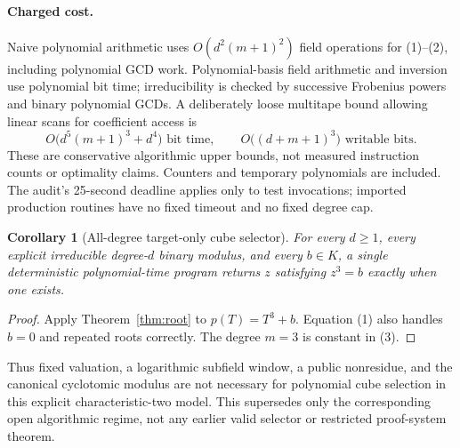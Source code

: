 \documentclass[11pt]{article}
\newtheorem{corollary}[theorem]{Corollary}
\begin{document}
\paragraph{Charged cost.}
Naive polynomial arithmetic uses $O(d^2(m+1)^2)$ field operations for
(1)--(2), including polynomial GCD work. Polynomial-basis field arithmetic
and inversion use polynomial bit time; irreducibility is checked by
successive Frobenius powers and binary polynomial GCDs. A deliberately loose
multitape bound allowing linear scans for coefficient access is
\[
 O\bigl(d^5(m+1)^3+d^4\bigr)\text{ bit time},
 \qquad O\bigl((d+m+1)^3\bigr)\text{ writable bits}.     \tag{3}
\]
These are conservative algorithmic upper bounds, not measured instruction
counts or optimality claims. Counters and temporary polynomials are included.
The audit's 25-second deadline applies only to test invocations; imported
production routines have no fixed timeout and no fixed degree cap.

\begin{corollary}[All-degree target-only cube selector]\label{cor:cube}
For every $d\ge1$, every explicit irreducible degree-$d$ binary modulus,
and every $b\in K$, a single deterministic polynomial-time program returns
$z$ satisfying $z^3=b$ exactly when one exists.
\end{corollary}
\begin{proof}
Apply Theorem~\ref{thm:root} to $p(T)=T^3+b$. Equation (1) also handles
$b=0$ and repeated roots correctly. The degree $m=3$ is constant in (3).
\end{proof}

Thus fixed valuation, a logarithmic subfield window, a public nonresidue,
and the canonical cyclotomic modulus are not necessary for polynomial
cube selection in this explicit characteristic-two model. This supersedes
only the corresponding open algorithmic regime, not any earlier valid
selector or restricted proof-system theorem.
\end{document}
